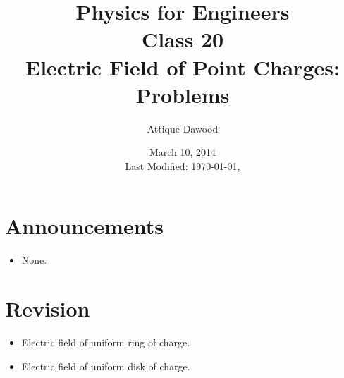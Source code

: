 \documentclass[12pt,a4paper]{article}
\title{\vspace{-3cm}Physics for Engineers\\Class 20\\Electric Field of Point Charges: Problems}
\author{Attique Dawood}
\date{March 10, 2014\\[0.2cm] Last Modified: \today, \currenttime}
\begin{document}
\maketitle
\section{Announcements}
\begin{itemize}
\item None.
\end{itemize}
\section{Revision}
\begin{itemize}
\item Electric field of uniform ring of charge.
\item Electric field of uniform disk of charge.
\end{itemize}
\end{document}
